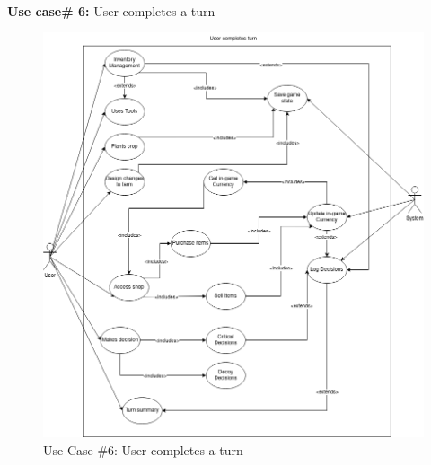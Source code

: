 \documentclass{article}
\begin{document}
\noindent\\
\newpage
\textbf{Use case\# 6:} User completes a turn\\
\begin{figure}[H]
    \centering
    \includegraphics[width=12cm]{srs_usecase.drawio.png}
    \caption{Use Case \#6: User completes a turn}
    \label{fig:context_diagram}
\end{figure}
\newpage
\end{document}
